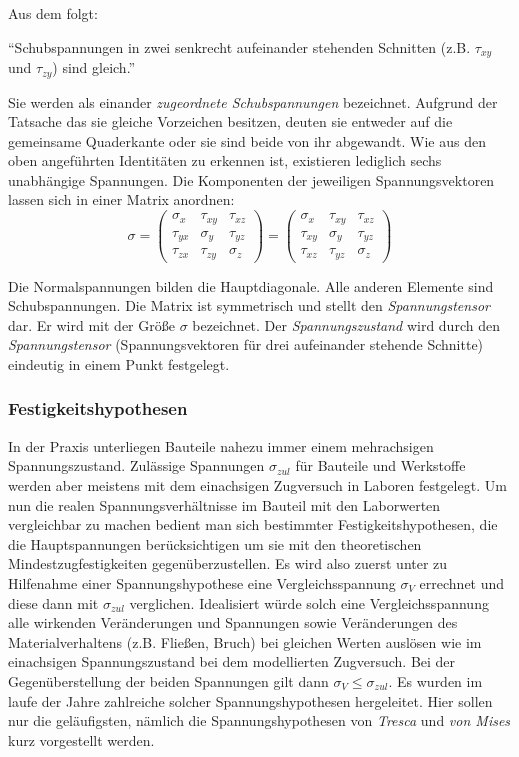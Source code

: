 \documentclass[12pt,a4paper,parskip,twoside,BCOR5mm,headsepline]{scrartcl}
\begin{document}
\begin{description*}
Aus dem folgt:

"`Schubspannungen in zwei senkrecht aufeinander stehenden Schnitten (z.B. $\tau_{xy}$ und $\tau_{zy}$) sind gleich."' \autocite[46]{tmr}

Sie werden als einander \emph{zugeordnete Schubspannungen} bezeichnet. Aufgrund der Tatsache das sie gleiche Vorzeichen besitzen, deuten sie entweder auf die gemeinsame Quaderkante oder sie sind beide von ihr abgewandt. Wie aus den oben angeführten Identitäten zu erkennen ist, existieren lediglich sechs unabhängige Spannungen. Die Komponenten der jeweiligen Spannungsvektoren lassen sich in einer Matrix anordnen:
\begin{equation}
\sigma = \begin{pmatrix}
\sigma_x & \tau_{xy} & \tau_{xz}\\
\tau_{yx} & \sigma_y & \tau_{yz}\\
\tau_{zx} & \tau_{zy} & \sigma_z
\end{pmatrix} = \begin{pmatrix}
\sigma_x & \tau_{xy} & \tau_{xz}\\
\tau_{xy} & \sigma_y & \tau_{yz}\\
\tau_{xz} & \tau_{yz} & \sigma_z
\end{pmatrix}
\end{equation}

Die Normalspannungen bilden die Hauptdiagonale. Alle anderen Elemente sind Schubspannungen. Die Matrix ist symmetrisch und stellt den \emph{Spannungstensor} dar. Er wird mit der Größe $ \sigma $ bezeichnet. Der \emph{Spannungszustand} wird durch den \emph{Spannungstensor} (Spannungsvektoren für drei aufeinander stehende Schnitte) eindeutig in einem Punkt festgelegt.   \autocite[43-46]{tmr}
\subsubsection{Festigkeitshypothesen}
In der Praxis unterliegen Bauteile nahezu immer einem mehrachsigen Spannungszustand. Zulässige Spannungen $ \sigma_{zul} $ für Bauteile und Werkstoffe werden aber meistens mit dem einachsigen Zugversuch in Laboren festgelegt. Um nun die realen Spannungsverhältnisse im Bauteil mit den Laborwerten vergleichbar zu machen bedient man sich bestimmter Festigkeitshypothesen, die die Hauptspannungen berücksichtigen um sie mit den theoretischen Mindestzugfestigkeiten gegenüberzustellen. Es wird also zuerst unter zu Hilfenahme einer Spannungshypothese eine Vergleichsspannung $ \sigma_V $ errechnet  und diese dann mit $ \sigma_{zul} $ verglichen. Idealisiert würde solch eine Vergleichsspannung alle wirkenden Veränderungen und Spannungen sowie Veränderungen des Materialverhaltens (z.B. Fließen, Bruch) bei gleichen Werten auslösen wie im einachsigen Spannungszustand bei dem modellierten Zugversuch. Bei der Gegenüberstellung der beiden Spannungen gilt dann $ \sigma_V \leq \sigma_{zul} $. Es wurden im laufe der Jahre zahlreiche solcher Spannungshypothesen hergeleitet. \autocite[399]{dd} Hier sollen nur die geläufigsten, nämlich die Spannungshypothesen von  \emph{Tresca} und \emph{von Mises} kurz vorgestellt werden.


\end{description*}
\end{document}
